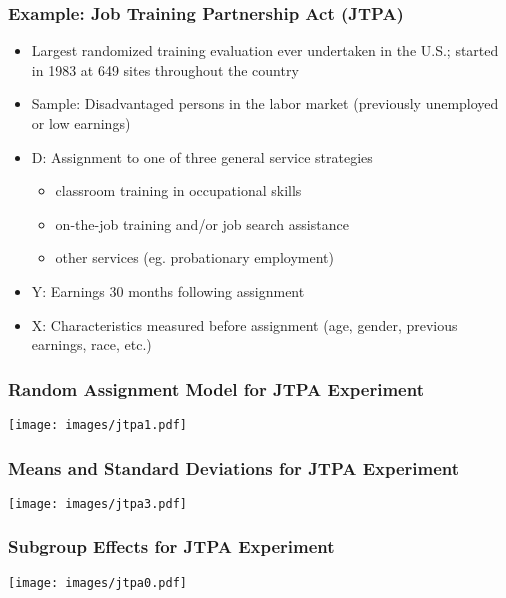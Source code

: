 \documentclass{beamer}
\numberwithin{equation}{section}
\begin{document}
%
%
%
%
%
\begin{frame}
  \frametitle{Example: Job Training Partnership Act (JTPA)}

\begin{itemize}
\item Largest randomized training evaluation ever undertaken in the U.S.; started in 1983 at 649 sites throughout the country
\item Sample: Disadvantaged persons in the labor market (previously unemployed or low earnings)
\item D: Assignment to one of three general service strategies
\begin{itemize}
\item classroom training in occupational skills
\item on-the-job training and/or job search assistance
\item other services (eg. probationary employment)
\end{itemize}
\item Y: Earnings 30 months following assignment
\item X: Characteristics measured before assignment (age, gender, previous earnings, race, etc.)
\end{itemize}
\end{frame}




\begin{frame}
  \frametitle{Random Assignment Model for JTPA Experiment}
  \texttt{[image: images/jtpa1.pdf]}
\end{frame}

 \begin{frame}
  \frametitle{Means and Standard Deviations for JTPA Experiment}
  \texttt{[image: images/jtpa3.pdf]}
\end{frame}

\begin{frame}
  \frametitle{Subgroup Effects for JTPA Experiment}
  \texttt{[image: images/jtpa0.pdf]}
\end{frame}
\end{document}
